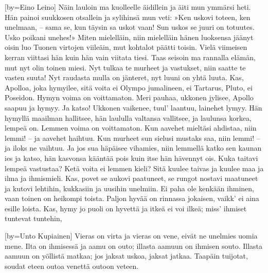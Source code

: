 [by={Eino Leino}]
  \beginverse
    Näin lauloin ma kuolleelle äidillein
    ja äiti mun ymmärsi heti.
    Hän painoi suukkosen otsallein
    ja sylihinsä mun veti:
    »Ken uskovi toteen, ken unelmaan, --
    sama se, kun täysin sa uskot vaan!
    Sun uskos se juuri on totuutes.
    Usko poikani unehes!»
  \endverse
  \beginverse
    Miten mielelläin, niin mielelläin
    hänen luoksensa jäänyt oisin
    luo Tuonen virtojen viileäin,
    mut kohtalot päätti toisin.
    Vielä viimeisen kerran viittasi hän
    kuin hän vain viitata tiesi.
    Taas seisoin ma rannalla elämän,
    mut nyt olin toinen miesi.
  \endverse
  \beginverse
    Nyt tulkaa te murheet ja vastukset,
    niin saatte te vasten suuta!
    Nyt raudasta mulla on jänteret,
    nyt luuni on yhtä luuta.
    Kas, Apolloa, joka hymyilee,
    sitä voita ei Olympo jumalineen,
    ei Tartarus, Pluto, ei Poseidon.
    Hymyn voima on voittamaton.
  \endverse
  \beginverse
    Meri pauhaa, ukkonen jylisee,
    Apollo saapuu ja hymyy.
    Ja katso! Ukkonen vaikenee,
    tuul' laantuu, lainehet lymyy.
    Hän hymyllä maailman hallitsee,
    hän laululla valtansa vallitsee,
    ja laulunsa korkea, lempeä on.
    Lemmen voima on voittamaton.
  \endverse
  \beginverse
    Kun aavehet mieltäsi ahdistaa,
    niin lemmi! -- ja aavehet haihtuu.
    Kun murheet sun sielusi mustaks saa,
    niin lemmi! -- ja iloks ne vaihtuu.
    Ja jos sua häpäisee vihamies,
    niin lemmellä katko sen kaunan ies
    ja katso, hän kasvonsa kääntää pois
    kuin itse hän hävennyt ois.
  \endverse
  \beginverse
    Kuka taitavi lempeä vastustaa?
    Ketä voita ei lemmen kieli?
    Sitä kuulee taivas ja kuulee maa
    ja ilma ja ihmismieli.
    Kas, povet se aukovi paatuneet,
    se rungot nostavi maatuneet
    ja kutovi lehtihin, kukkasiin
    ja uusihin unelmiin.
  \endverse
  \beginverse
    Ei paha ole kenkään ihminen,
    vaan toinen on heikompi toista.
    Paljon hyvää on rinnassa jokaisen,
    vaikk' ei aina esille loista.
    Kas, hymy jo puoli on hyvettä
    ja itkeä ei voi ilkeä;
    miss' ihmiset tuntevat tuntehin,
  \endverse
\endsong


[by={Unto Kupiainen}]
  \beginverse
    Vieras on virta ja vieras on vene, 
    eivät ne unelmies uomia mene. 
    Ilta on ihmisessä ja aamu on outo; 
    illasta aamuun on ihmisen souto. 
    Illasta aamuun on yöllistä matkaa; 
    jos jaksat uskoa, jaksat jatkaa. 
    Taapäin tuijotat, soudat eteen 
    outoa venettä outoon veteen. 
  \endverse
\endsong

